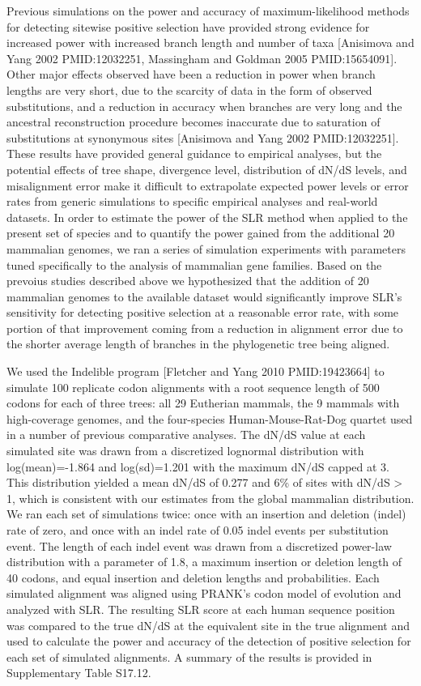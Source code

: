 Previous simulations on the power and accuracy of maximum-likelihood
methods for detecting sitewise positive selection have provided strong
evidence for increased power with increased branch length and number
of taxa [Anisimova and Yang 2002 PMID:12032251, Massingham and Goldman
  2005 PMID:15654091]. Other major effects observed have been a
reduction in power when branch lengths are very short, due to the
scarcity of data in the form of observed substitutions, and a
reduction in accuracy when branches are very long and the ancestral
reconstruction procedure becomes inaccurate due to saturation of
substitutions at synonymous sites [Anisimova and Yang 2002
  PMID:12032251]. These results have provided general guidance to
empirical analyses, but the potential effects of tree shape,
divergence level, distribution of dN/dS levels, and misalignment error
make it difficult to extrapolate expected power levels or error rates
from generic simulations to specific empirical analyses and real-world
datasets. In order to estimate the power of the SLR method when
applied to the present set of species and to quantify the power gained
from the additional 20 mammalian genomes, we ran a series of
simulation experiments with parameters tuned specifically to the
analysis of mammalian gene families. Based on the prevoius studies
described above we hypothesized that the addition of 20 mammalian
genomes to the available dataset would significantly improve SLR’s
sensitivity for detecting positive selection at a reasonable error
rate, with some portion of that improvement coming from a reduction in
alignment error due to the shorter average length of branches in the
phylogenetic tree being aligned.

We used the Indelible program [Fletcher and Yang 2010 PMID:19423664]
to simulate 100 replicate codon alignments with a root sequence length
of 500 codons for each of three trees: all 29 Eutherian mammals, the 9
mammals with high-coverage genomes, and the four-species
Human-Mouse-Rat-Dog quartet used in a number of previous comparative
analyses. The dN/dS value at each simulated site was drawn from a
discretized lognormal distribution with log(mean)=-1.864 and
log(sd)=1.201 with the maximum dN/dS capped at 3. This distribution
yielded a mean dN/dS of 0.277 and 6\% of sites with dN/dS > 1, which
is consistent with our estimates from the global mammalian
distribution. We ran each set of simulations twice: once with an
insertion and deletion (indel) rate of zero, and once with an indel
rate of 0.05 indel events per substitution event. The length of each
indel event was drawn from a discretized power-law distribution with a
parameter of 1.8, a maximum insertion or deletion length of 40 codons,
and equal insertion and deletion lengths and probabilities. Each
simulated alignment was aligned using PRANK’s codon model of evolution
and analyzed with SLR. The resulting SLR score at each human sequence
position was compared to the true dN/dS at the equivalent site in the
true alignment and used to calculate the power and accuracy of the
detection of positive selection for each set of simulated
alignments. A summary of the results is provided in Supplementary
Table S17.12.

